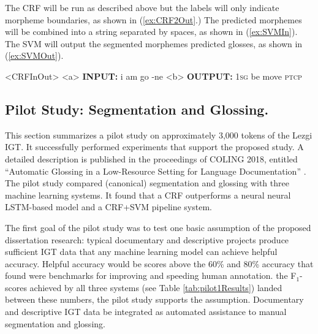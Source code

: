 The CRF will be run as described above but the labels will only indicate morpheme boundaries, as shown in (\ref{ex:CRF2Out}.) The predicted morphemes will be combined into a string separated by spaces, as shown in (\ref{ex:SVMIn}). The SVM will output the segmented morphemes predicted glosses, as shown in (\ref{ex:SVMOut}). 

\begin{singlespace}
\pex<CRFInOut>   
\label{ex:SVMInOut}
\a<a> \textbf{INPUT:} \hspace{7 mm} i \hspace{4 mm} am \hspace{2 mm} go \hspace{5 mm} -ne 
\label{ex:SVMIn}
\a<b> \textbf{OUTPUT:} \hspace{1 mm} 1\textsc{sg} \hspace{1 mm} be \hspace{1 mm} move \hspace{1 mm} \textsc{ptcp}
\label{ex:SVMOut}
\xe
\end{singlespace}


\subsection{Pilot Study: Segmentation and Glossing.}
\label{sec:pilotseggls}

This section summarizes a pilot study on approximately 3,000 tokens of the Lezgi IGT. It successfully performed experiments that support the proposed study. A detailed description is published in the proceedings of COLING 2018, entitled ``Automatic Glossing in a Low-Resource Setting for Language Documentation'' \citep{moeller_automatic_2018}. The pilot study compared (canonical) segmentation and glossing with three machine learning systems. It found that a CRF outperforms a neural neural LSTM-based model and a CRF+SVM pipeline system. 

The first goal of the pilot study was to test one basic assumption of the proposed dissertation research: typical documentary and descriptive projects produce sufficient IGT data that any machine learning model can achieve helpful accuracy. Helpful accuracy would be scores above the 60\% and 80\% accuracy that \cite{felt_improving_2012} found were benchmarks for improving and speeding human annotation. 
the F$_1$-scores achieved by all three systems (see Table \ref{tab:pilot1Results}) landed between these numbers, the pilot study supports the assumption. Documentary and descriptive IGT data be integrated as automated assistance to manual segmentation and glossing. 

